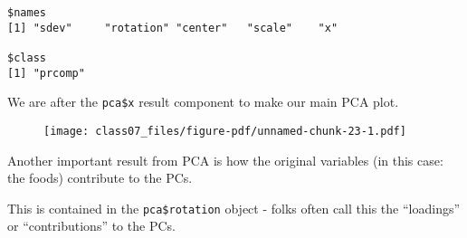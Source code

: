 \documentclass[
  letterpaper,
  DIV=11,
  numbers=noendperiod]{scrartcl}
\newenvironment{Shaded}{\begin{snugshade}}{\end{snugshade}}
\newcommand{\AttributeTok}[1]{\textcolor[rgb]{0.40,0.45,0.13}{#1}}
\newcommand{\DecValTok}[1]{\textcolor[rgb]{0.68,0.00,0.00}{#1}}
\newcommand{\FunctionTok}[1]{\textcolor[rgb]{0.28,0.35,0.67}{#1}}
\newcommand{\NormalTok}[1]{\textcolor[rgb]{0.00,0.23,0.31}{#1}}
\newcommand{\OtherTok}[1]{\textcolor[rgb]{0.00,0.23,0.31}{#1}}
\newcommand{\SpecialCharTok}[1]{\textcolor[rgb]{0.37,0.37,0.37}{#1}}
\newcommand{\StringTok}[1]{\textcolor[rgb]{0.13,0.47,0.30}{#1}}
\begin{document}
\begin{verbatim}
$names
[1] "sdev"     "rotation" "center"   "scale"    "x"       

$class
[1] "prcomp"
\end{verbatim}

We are after the \texttt{pca\$x} result component to make our main PCA
plot.

\begin{Shaded}
\end{Shaded}

\begin{figure}[H]

{\centering \texttt{[image: class07\_files/figure-pdf/unnamed-chunk-23-1.pdf]}

}

\end{figure}

Another important result from PCA is how the original variables (in this
case: the foods) contribute to the PCs.

This is contained in the \texttt{pca\$rotation} object - folks often
call this the ``loadings'' or ``contributions'' to the PCs.

\begin{Shaded}
\end{Shaded}
\end{document}
